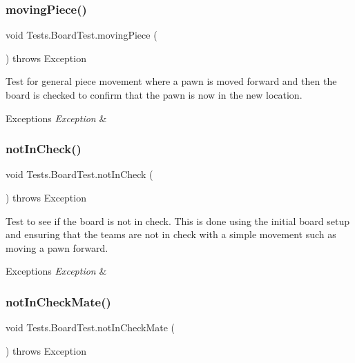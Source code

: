 \subsubsection{\texorpdfstring{moving\+Piece()}{movingPiece()}}
{\footnotesize\ttfamily void Tests.\+Board\+Test.\+moving\+Piece (\begin{DoxyParamCaption}{ }\end{DoxyParamCaption}) throws Exception}

Test for general piece movement where a pawn is moved forward and then the board is checked to confirm that the pawn is now in the new location. 
\begin{DoxyExceptions}{Exceptions}
{\em Exception} & \\
\hline
\end{DoxyExceptions}
\hypertarget{class_tests_1_1_board_test_a929e0f87bd865f7fdf810ab37768f4e8}{}\label{class_tests_1_1_board_test_a929e0f87bd865f7fdf810ab37768f4e8} 
\subsubsection{\texorpdfstring{not\+In\+Check()}{notInCheck()}}
{\footnotesize\ttfamily void Tests.\+Board\+Test.\+not\+In\+Check (\begin{DoxyParamCaption}{ }\end{DoxyParamCaption}) throws Exception}

Test to see if the board is not in check. This is done using the initial board setup and ensuring that the team\textquotesingle{}s are not in check with a simple movement such as moving a pawn forward. 
\begin{DoxyExceptions}{Exceptions}
{\em Exception} & \\
\hline
\end{DoxyExceptions}
\hypertarget{class_tests_1_1_board_test_a2e13dc59ccbbdb6535ed634b612b2fb1}{}\label{class_tests_1_1_board_test_a2e13dc59ccbbdb6535ed634b612b2fb1} 
\subsubsection{\texorpdfstring{not\+In\+Check\+Mate()}{notInCheckMate()}}
{\footnotesize\ttfamily void Tests.\+Board\+Test.\+not\+In\+Check\+Mate (\begin{DoxyParamCaption}{ }\end{DoxyParamCaption}) throws Exception}

